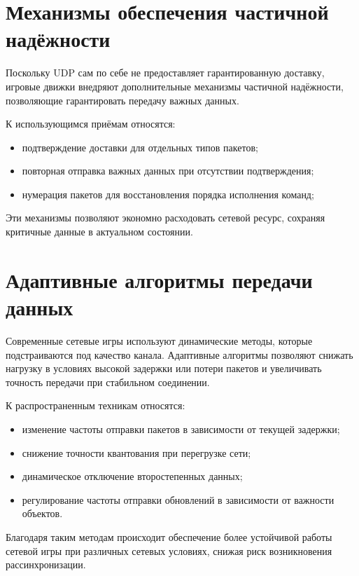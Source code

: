 \section{Механизмы обеспечения частичной надёжности}

Поскольку UDP сам по себе не предоставляет гарантированную доставку, игровые движки внедряют
дополнительные механизмы частичной надёжности, позволяющие гарантировать передачу важных
данных.

К использующимся приёмам относятся:

\begin{itemize}
    \item подтверждение доставки для отдельных типов пакетов;
    \item повторная отправка важных данных при отсутствии подтверждения;
    \item нумерация пакетов для восстановления порядка исполнения команд;
\end{itemize}

Эти механизмы позволяют экономно расходовать сетевой ресурс, сохраняя критичные данные в
актуальном состоянии.

\section{Адаптивные алгоритмы передачи данных}

Современные сетевые игры используют динамические методы, которые подстраиваются под качество канала.
Адаптивные алгоритмы позволяют снижать нагрузку в условиях высокой задержки или потери пакетов и
увеличивать точность передачи при стабильном соединении.

К распространенным техникам относятся:

\begin{itemize}
    \item изменение частоты отправки пакетов в зависимости от текущей задержки;
    \item снижение точности квантования при перегрузке сети;
    \item динамическое отключение второстепенных данных;
    \item регулирование частоты отправки обновлений в зависимости от важности объектов.
\end{itemize}

Благодаря таким методам происходит обеспечение более устойчивой работы сетевой игры при различных сетевых условиях, снижая риск
возникновения рассинхронизации.
